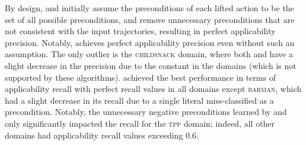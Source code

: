 By design, \samshort{} and \offlam{} initially assume the preconditions of each lifted action to be the set of all possible preconditions, and remove unnecessary preconditions that are not consistent with the input trajectories, resulting in perfect applicability precision. Notably, \nolam{} achieves perfect applicability precision even without such an assumption.
The only outlier is the \textsc{childsnack} domain, where both \nolam{} and \offlam{} have a slight decrease in the precision due to the constant in the domains (which is not supported by these algorithms).
\offlam{} achieved the best performance in terms of applicability recall with perfect recall values in all domains except \textsc{barman}, which had a slight decrease in its recall due to a single literal miss-classified as a precondition. 
Notably, the unnecessary negative preconditions learned by \samshort{} and \nolam{} only significantly impacted the recall for the \textsc{tpp} domain; indeed, all other domains had applicability recall values exceeding $0.6$. 


